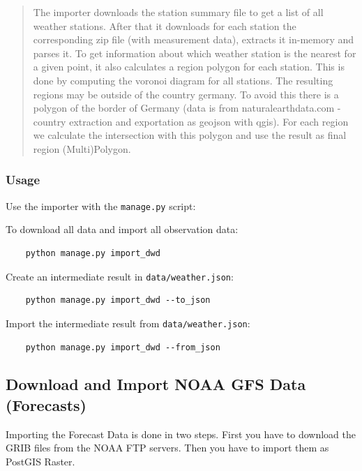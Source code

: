 \documentclass[paper=a4, fontsize=11pt]{article} %
\numberwithin{equation}{section} %
\numberwithin{figure}{section} %
\numberwithin{table}{section} %
\begin{document}
\begin{quote}
The importer downloads the station summary file to get a list of all weather stations. After that it downloads for each station the corresponding zip file (with measurement data), extracts it in-memory and parses it. To get information about which weather station is the nearest for a given point, it also calculates a region polygon for each station. This is done by computing the voronoi diagram for all stations. The resulting regions may be outside of the country germany. To avoid this there is a polygon of the border of Germany (data is from naturalearthdata.com - country extraction and exportation as geojson with qgis). For each region we calculate the intersection with this polygon and use the result as final region (Multi)Polygon.
\end{quote}

\subsubsection*{Usage}\label{usage-1}

Use the importer with the \texttt{manage.py} script:

To download all data and import all observation data:

\begin{lstlisting}
	python manage.py import_dwd
\end{lstlisting}


Create an intermediate result in \texttt{data/weather.json}:

\begin{lstlisting}
	python manage.py import_dwd --to_json
\end{lstlisting}


Import the intermediate result from \texttt{data/weather.json}:

\begin{lstlisting}
	python manage.py import_dwd --from_json
\end{lstlisting}


\subsection{Download and Import NOAA GFS Data
(Forecasts)}\label{download-and-import-noaa-gfs-data-forecasts}

Importing the Forecast Data is done in two steps. First you have to
download the GRIB files from the NOAA FTP servers. Then you have to
import them as PostGIS Raster.
\end{document}
